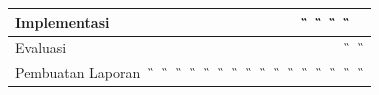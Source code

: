 \begin{table}[h!]
\begin{tabular}{|p{3.5cm}|c|c|c|c|c|c|c|c|c|c|c|c|c|c|c|c|}
    Implementasi              &
    \w                        & \w                            & \w & \w & \w & \w & \w & \w & \w & \w & \w & \G & \G & \G & \G & \w \\
    \hline

    Evaluasi                  &
    \w                        & \w                            & \w & \w & \w & \w & \w & \w & \w & \w & \w & \w & \w & \w & \G & \G \\
    \hline

    Pembuatan Laporan         &
    \G                        & \G                            & \G & \G & \G & \G & \G & \G & \G & \G & \G & \G & \G & \G & \G & \G \\
    \hline
  \end{tabular}
\end{table}